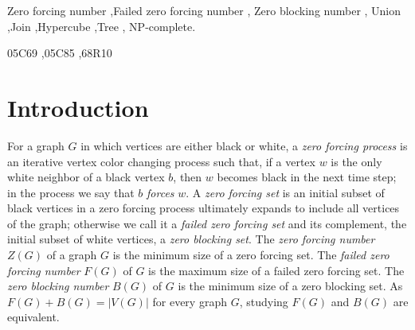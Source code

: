 \documentclass[preprint,12pt]{elsarticle}
\begin{document}
\begin{frontmatter}
\begin{abstract}
\end{abstract}



\begin{keyword}
Zero forcing number \sep Failed zero forcing number \sep
Zero blocking number \sep
Union \sep Join \sep Hypercube \sep Tree \sep
NP-complete.

\MSC 05C69 \sep 05C85 \sep 68R10

\end{keyword}

\end{frontmatter}




\section{Introduction}

For a graph $G$ in which vertices are either black or white, a {\em zero forcing process} is an iterative vertex color changing process such that,
if a vertex $w$ is the only white neighbor of a black vertex $b$, then $w$ becomes black in the next time step; in the process we say that $b$ {\em forces} $w$.
A {\em zero forcing set} is an initial subset of black vertices in a zero forcing process ultimately expands to include all vertices of the graph;
otherwise we call it a {\em failed zero forcing set}
and its complement, the initial subset of white vertices, a {\em zero blocking set}.
The {\em zero forcing number} $Z(G)$ of a graph $G$ is the minimum size of a zero forcing set.
The {\em failed zero forcing number} $F(G)$ of $G$ is the maximum size of a failed zero forcing set.
The {\em zero blocking number} $B(G)$ of $G$ is the minimum size of a zero blocking set.
As $F(G)+B(G)=|V(G)|$ for every graph $G$,
studying $F(G)$ and $B(G)$ are equivalent.
\end{document}
